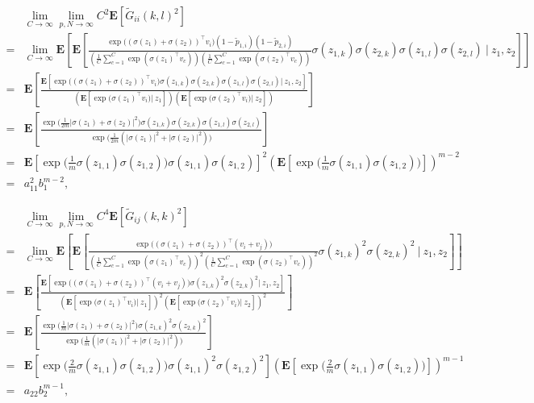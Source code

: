 \documentclass{article}
\newcommand{\E}{\mathbf{E}}
\newcommand{\wt}{\widetilde}
\newcommand{\rw}{\rightarrow}
\newcommand{\1}{^{(1)}}
\newcommand{\2}{^{(2)}}
\renewcommand{\l}{\left}
\renewcommand{\r}{\right}
\newcommand{\bea}{\begin{equation}\begin{aligned}}
\newcommand{\eea}{\end{aligned}\end{equation}}
\begin{document}
\bea
&\lim_{C\rw\infty}\lim_{p,N\rw\infty}C^2\E\l[\wt{G}_{ii}(k,l)^2\r]\\
=&\lim_{C\rw\infty}\E\l[\E\l[\frac{\exp\big((\sigma(z_1)+\sigma(z_2))^\top v_i\big)(1-\wt{p}_{1,i})(1-\wt{p}_{2,i})}{\l(\frac{1}{C}\sum_{c=1}^C\exp(\sigma(z_1)^\top v_c)\r)\l(\frac{1}{C}\sum_{c=1}^C\exp(\sigma(z_2)^\top v_c)\r)} \sigma(z_{1,k})\sigma(z_{2,k})\sigma(z_{1,l})\sigma(z_{2,l})\ \bigg|\ z_1,z_2 \r]\r]\\
=&\E\l[\frac{\E\l[ \exp\big((\sigma(z_1)+\sigma(z_2))^\top v_i\big)\sigma(z_{1,k})\sigma(z_{2,k})\sigma(z_{1,l})\sigma(z_{2,l}) \bigg|\ z_1,z_2 \r]}{\l(\E\l[ \exp\big(\sigma(z_1)^\top v_i\big)\bigg|\ z_1 \r]\r)\l(\E\l[\exp\big(\sigma(z_2)^\top v_i\big)\bigg|\ z_2 \r]\r)}\r]\\
=&\E\l[ \frac{\exp\big(\frac{1}{2m}|\sigma(z_1)+\sigma(z_2)|^2\big)\sigma(z_{1,k})\sigma(z_{2,k})\sigma(z_{1,l})\sigma(z_{2,l})}{\exp\big(\frac{1}{2m}(|\sigma(z_1)|^2+|\sigma(z_2)|^2)\big)} \r]\\
=&\E\l[\exp\big(\frac{1}{m}\sigma(z_{1,1})\sigma(z_{1,2})\big)\sigma(z_{1,1})\sigma(z_{1,2})\r]^2\l( \E\l[\exp\big(\frac{1}{m}\sigma(z_{1,1})\sigma(z_{1,2})\big)\r] \r)^{m-2}\\
=&a_{11}^2b_1^{m-2},
\eea

\bea
&\lim_{C\rw\infty}\lim_{p,N\rw\infty}C^4\E\l[\wt{G}_{ij}(k,k)^2\r]\\
=&\lim_{C\rw\infty}\E\l[\E\l[\frac{\exp\big((\sigma(z_1)+\sigma(z_2))^\top (v_i+v_j)\big)}{\l(\frac{1}{C}\sum_{c=1}^C\exp(\sigma(z_1)^\top v_c)\r)^2\l(\frac{1}{C}\sum_{c=1}^C\exp(\sigma(z_2)^\top v_c)\r)^2}\sigma(z_{1,k})^2\sigma(z_{2,k})^2\ \bigg|\ z_1,z_2 \r]\r]\\
=&\E\l[\frac{\E\l[ \exp\big((\sigma(z_1)+\sigma(z_2))^\top (v_i+v_j)\big)\sigma(z_{1,k})^2\sigma(z_{2,k})^2 \bigg|\ z_1,z_2 \r]}{\l(\E\l[ \exp\big(\sigma(z_1)^\top v_i\big)\bigg|\ z_1 \r]\r)^2\l(\E\l[\exp\big(\sigma(z_2)^\top v_i\big)\bigg|\ z_2 \r]\r)^2}\r]\\
=&\E\l[ \frac{\exp\big(\frac{1}{m}|\sigma(z_1)+\sigma(z_2)|^2\big)\sigma(z_{1,k})^2\sigma(z_{2,k})^2}{\exp\big(\frac{1}{m}(|\sigma(z_1)|^2+|\sigma(z_2)|^2)\big)} \r]\\
=&\E\l[\exp\big(\frac{2}{m}\sigma(z_{1,1})\sigma(z_{1,2})\big)\sigma(z_{1,1})^2\sigma(z_{1,2})^2\r]\l( \E\l[\exp\big(\frac{2}{m}\sigma(z_{1,1})\sigma(z_{1,2})\big)\r] \r)^{m-1}\\
=&a_{22}b_2^{m-1},
\eea
\end{document}

